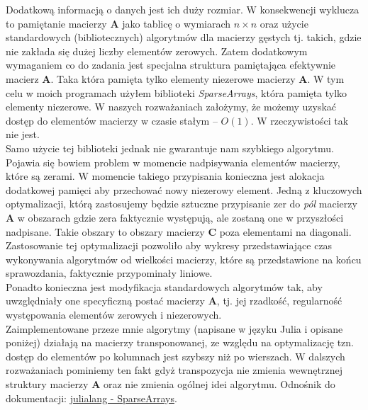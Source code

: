 \documentclass[]{article}
\newcommand{\mA}{\bm{A}}
\newcommand{\mC}{\bm{C}}
\begin{document}
	Dodatkową informacją o danych jest ich duży rozmiar. W konsekwencji wyklucza to pamiętanie macierzy $\mA$ jako tablicę o wymiarach $n \times n$ oraz użycie standardowych (bibliotecznych) algorytmów dla macierzy gęstych tj. takich, gdzie
	nie zakłada się dużej liczby elementów zerowych. Zatem dodatkowym wymaganiem co do zadania jest specjalna struktura pamiętająca efektywnie macierz $\mA$. Taka która pamięta tylko elementy niezerowe macierzy $\mA$. W tym celu w moich programach użyłem biblioteki \textit{SparseArrays}, która pamięta tylko elementy niezerowe. W naszych rozważaniach założymy, że możemy uzyskać dostęp do elementów macierzy w czasie stałym -- $O(1)$. W rzeczywistości tak nie jest. \\
	Samo użycie tej biblioteki jednak nie gwarantuje nam szybkiego algorytmu. Pojawia się bowiem problem w momencie nadpisywania elementów macierzy, które są zerami. W momencie takiego przypisania konieczna jest alokacja dodatkowej pamięci aby przechować nowy niezerowy element. Jedną z kluczowych optymalizacji, którą zastosujemy będzie sztuczne przypisanie zer do \textit{pól} macierzy $\mA$ w obszarach gdzie zera faktycznie występują, ale zostaną one w przyszłości nadpisane. Takie obszary to obszary macierzy $\mC$ poza elementami na diagonali. Zastosowanie tej optymalizacji pozwoliło aby wykresy przedstawiające czas wykonywania algorytmów od wielkości macierzy, które są przedstawione na końcu sprawozdania, faktycznie przypominały liniowe.\\
	Ponadto konieczna jest modyfikacja standardowych algorytmów tak, aby uwzględniały one specyficzną postać macierzy $\mA$, tj.
	jej rzadkość, regularność występowania elementów zerowych i niezerowych.\\
	
	\noindent Zaimplementowane przeze mnie algorytmy (napisane w języku Julia i opisane poniżej) działają na macierzy transponowanej, ze względu na optymalizację tzn. dostęp do elementów po kolumnach jest szybszy niż po wierszach. W dalszych rozważaniach pominiemy ten fakt gdyż transpozycja nie zmienia wewnętrznej struktury macierzy $\mA$ oraz nie zmienia ogólnej idei algorytmu.
	Odnośnik do dokumentacji: 
	\href{https://docs.julialang.org/en/v1/stdlib/SparseArrays/}{julialang - SparseArrays}.
	
\end{document}
